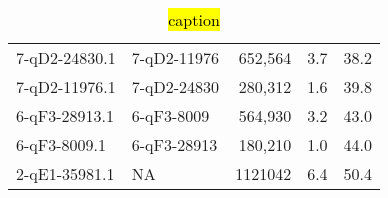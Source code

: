 \begin{table}[h]
\begin{tabular}{llrrr}
7-qD2-24830.1         & 7-qD2-11976                                                         & 652,564                                                                                 & 3.7                                                                                 & 38.2                                                                               \\
7-qD2-11976.1         & 7-qD2-24830                                                         & 280,312                                                                                 & 1.6                                                                                 & 39.8                                                                               \\
6-qF3-28913.1         & 6-qF3-8009                                                          & 564,930                                                                                 & 3.2                                                                                 & 43.0                                                                               \\
6-qF3-8009.1          & 6-qF3-28913                                                         & 180,210                                                                                 & 1.0                                                                                 & 44.0                                                                               \\
2-qE1-35981.1         & NA                                                                  & 1121042                                                                                 & 6.4                                                                                 & 50.4                                                                               \\ \hline
\end{tabular}
  \caption[Just 9 piRNA genes create >50\% of mammalian piRNAs]{\hl{caption}}
  \label{tab:FlyGenesWithManyTx}
\end{table}